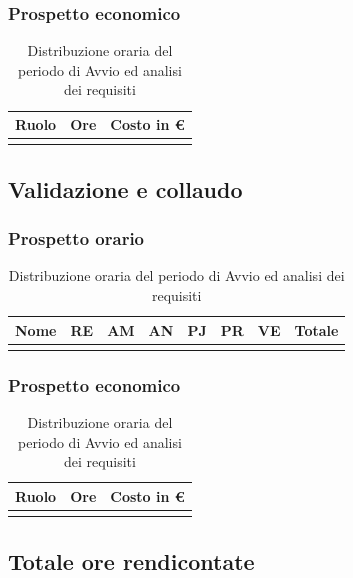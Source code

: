 \subsubsection{Prospetto economico}
\begin{longtable}{| C{.30\textwidth}| C{.15\textwidth}| C{.20\textwidth}|}
\hline
\textbf{Ruolo} & \textbf{Ore} & \textbf{Costo in \euro} \\
\hline 


\caption{Distribuzione oraria del periodo di Avvio ed analisi dei requisiti}
\label{Distribuzione oraria del periodo di Avvio ed analisi dei requisiti}
\end{longtable}


\subsection{Validazione e collaudo}
\subsubsection{Prospetto orario}
\begin{longtable}{|C{.30\textwidth}|C{.06\textwidth}|C{.06\textwidth}|C{.06\textwidth} | C{.06\textwidth}| C{.06\textwidth} | C{.06\textwidth} | C{.10\textwidth} |}
\hline
\textbf{Nome} & \textbf{RE} & \textbf{AM} & \textbf{AN} & \textbf{PJ} & \textbf{PR} & \textbf{VE} & \textbf{Totale}\\
\hline 


\caption{Distribuzione oraria del periodo di Avvio ed analisi dei requisiti}
\label{Distribuzione oraria del periodo di Avvio ed analisi dei requisiti}
\end{longtable}

\subsubsection{Prospetto economico}
\begin{longtable}{| C{.30\textwidth}| C{.15\textwidth}| C{.20\textwidth}|}
\hline
\textbf{Ruolo} & \textbf{Ore} & \textbf{Costo in \euro} \\
\hline 


\caption{Distribuzione oraria del periodo di Avvio ed analisi dei requisiti}
\label{Distribuzione oraria del periodo di Avvio ed analisi dei requisiti}
\end{longtable}


\subsection{Totale ore rendicontate}
